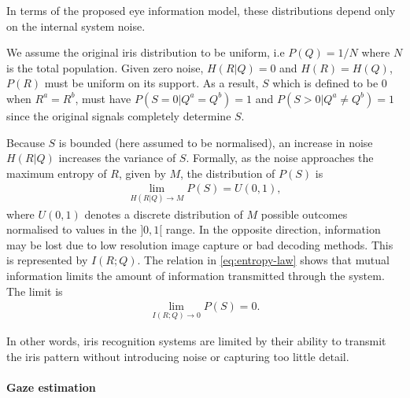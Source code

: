 In terms of the proposed eye information model, these distributions depend only on the internal system noise. 

We assume the original iris distribution to be uniform, i.e $P(Q)=1/N$ where $N$ is the total population. Given zero noise, $H(R|Q)=0$ and $H(R)=H(Q)$, $P(R)$ must be uniform on its support. As a result, $S$ which is defined to be $0$ when $R^a = R^b$, must have $P(S=0|Q^a = Q^b)=1$ and $P(S>0|Q^a \neq Q^b)=1$ since the original signals completely determine $S$. 

Because $S$ is bounded (here assumed to be normalised), an increase in noise $H(R|Q)$ increases the variance of $S$. Formally, as the noise approaches the maximum entropy of $R$, given by $M$, the distribution of $P(S)$ is
\begin{align}
\lim_{H(R|Q)\rightarrow M} P(S) = U(0, 1),
\end{align}
where $U(0, 1)$ denotes a discrete distribution of $M$ possible outcomes normalised to values in the $]0, 1[$ range. In the opposite direction, information may be lost due to low resolution image capture or bad decoding methods. This is represented by $I(R;Q)$. The relation in \autoref{eq:entropy-law} shows that mutual information limits the amount of information transmitted through the system. The limit is
\begin{align}
\lim_{I(R;Q)\rightarrow 0} P(S) = 0.
\end{align}

In other words, iris recognition systems are limited by their ability to transmit the iris pattern without introducing noise or capturing too little detail.

\paragraph{Gaze estimation}

